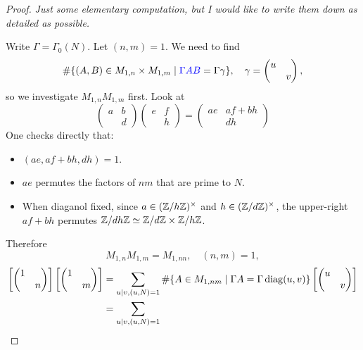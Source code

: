 \begin{proof}
    \textit{Just some elementary computation, but I would like to write them down as detailed as possible.}

    Write $\Gamma = \Gamma_0(N)$.
    Let $(n, m) = 1$.
    We need to find
    \[\#\{(A, B)\in M_{1, n}\times M_{1, m}\mid {\color{blue}\Gamma AB} = \Gamma \gamma\},\quad \gamma = \begin{pmatrix}
        u & \\ & v
    \end{pmatrix},\]
    so we investigate $M_{1, n}M_{1, m}$ first.
    Look at \[\begin{pmatrix}
        a & b \\ & d
    \end{pmatrix}\begin{pmatrix}
        e & f \\ & h
    \end{pmatrix} = \begin{pmatrix}
        ae & af + bh \\ & dh
    \end{pmatrix}\]
    One checks directly that:\begin{itemize}
        \item $(ae, af + bh, dh) = 1$.
        \item $ae$ permutes the factors of $nm$ that are prime to $N$.
        \item When diaganol fixed, since $a\in(\mathbb{Z}/h\mathbb{Z})^\times$ and $h\in(\mathbb{Z}/d\mathbb{Z})^\times$,
        the upper-right $af + bh$ permutes
        $\mathbb{Z}/dh\mathbb{Z}\simeq\mathbb{Z}/d\mathbb{Z}\times\mathbb{Z}/h\mathbb{Z}$.
    \end{itemize}
    Therefore \[M_{1, n}M_{1, m} = M_{1, nn},\quad (n, m) = 1,\]
    \begin{align*}
        \left[ \begin{pmatrix}
            1&\\ & n
        \end{pmatrix} \right]\left[ \begin{pmatrix}
            1&\\ & m
        \end{pmatrix} \right] 
        &= \sum_{u\mid v, (u, N) = 1}
        \#\{A\in M_{1, nm}\mid \Gamma A = \Gamma\diag(u, v)\}\left[ \begin{pmatrix}
            u &\\ & v
        \end{pmatrix} \right]\\
        &= \sum_{u\mid v, (u, N) = 1}

\end{align*}
\end{proof}
